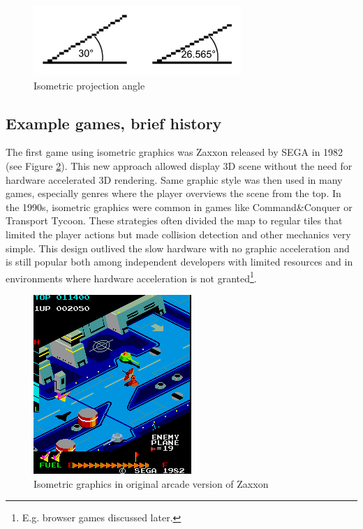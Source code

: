 \documentclass[11pt,oneside, final]{fithesis2}
\begin{document}
\begin{figure}[htp]
	\centering
	\includegraphics[width=0.7\textwidth]{thesis-angles}
	\caption{Isometric projection angle}
	\label{isoangle}
\end{figure}

\subsection{Example games, brief history}
The first game using isometric graphics was Zaxxon released by SEGA in 1982\cite{zaxxon} (see Figure \ref{zaxxon}). This new approach allowed display 3D scene without the need for hardware accelerated 3D rendering. Same graphic style was then used in many games, especially genres where the player overviews the scene from the top. In the 1990s, isometric graphics were common in games like Command\&Conquer or Transport Tycoon. These strategies often divided the map to regular tiles that limited the player actions but made collision detection and other mechanics very simple. This design outlived the slow hardware with no graphic acceleration and is still popular both among independent developers with limited resources and in environments where hardware acceleration is not granted\footnote{E.g. browser games discussed later.}.

\begin{figure}[htp]
	\centering
	\includegraphics{zaxxon}
	\caption{Isometric graphics in original arcade version of Zaxxon\cite{zaxxon}}
	\label{zaxxon}
\end{figure}
\end{document}
